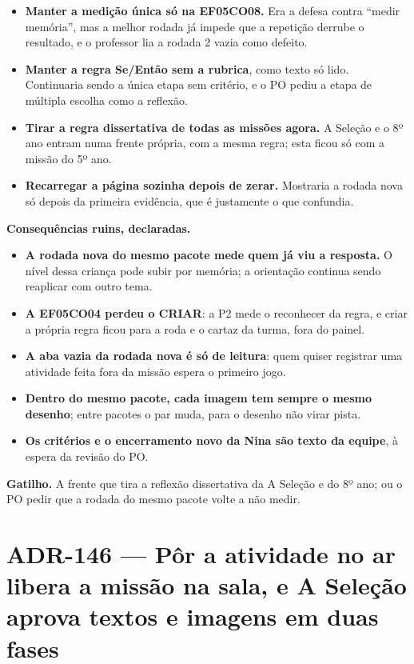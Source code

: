 \begin{itemize}
  \item \textbf{Manter a medição única só na EF05CO08.} Era a defesa contra
    \enquote{medir memória}, mas a melhor rodada já impede que a repetição
    derrube o resultado, e o professor lia a rodada 2 vazia como defeito.
  \item \textbf{Manter a regra Se/Então sem a rubrica}, como texto só lido.
    Continuaria sendo a única etapa sem critério, e o PO pediu a etapa de
    múltipla escolha como a reflexão.
  \item \textbf{Tirar a regra dissertativa de todas as missões agora.} A
    Seleção e o 8º ano entram numa frente própria, com a mesma regra; esta
    ficou só com a missão do 5º ano.
  \item \textbf{Recarregar a página sozinha depois de zerar.} Mostraria a
    rodada nova só depois da primeira evidência, que é justamente o que
    confundia.
\end{itemize}

\textbf{Consequências ruins, declaradas.}

\begin{itemize}
  \item \textbf{A rodada nova do mesmo pacote mede quem já viu a resposta.}
    O nível dessa criança pode subir por memória; a orientação continua sendo
    reaplicar com outro tema.
  \item \textbf{A EF05CO04 perdeu o CRIAR}: a P2 mede o reconhecer da regra,
    e criar a própria regra ficou para a roda e o cartaz da turma, fora do
    painel.
  \item \textbf{A aba vazia da rodada nova é só de leitura}: quem quiser
    registrar uma atividade feita fora da missão espera o primeiro jogo.
  \item \textbf{Dentro do mesmo pacote, cada imagem tem sempre o mesmo
    desenho}; entre pacotes o par muda, para o desenho não virar pista.
  \item \textbf{Os critérios e o encerramento novo da Nina são texto da
    equipe}, à espera da revisão do PO.
\end{itemize}

\textbf{Gatilho.} A frente que tira a reflexão dissertativa da A Seleção e do
8º ano; ou o PO pedir que a rodada do mesmo pacote volte a não medir.

\section{ADR-146 --- Pôr a atividade no ar libera a missão na sala, e A Seleção aprova textos e imagens em duas fases}
\label{adr:no-ar-libera-e-duas-fases}

